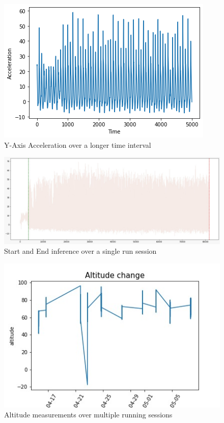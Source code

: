 \documentclass[
  12pt,
]{article}
\begin{document}
\begin{figure}
\centering
\includegraphics{Acc.png}
\caption{Y-Axis Acceleration over a longer time interval}
\end{figure}

\begin{figure}
\centering
\includegraphics{StartStop.jpeg}
\caption{Start and End inference over a single run session}
\end{figure}

\begin{figure}
\centering
\includegraphics{Altitude.jpeg}
\caption{Altitude measurements over multiple running sessions}
\end{figure}
\end{document}

